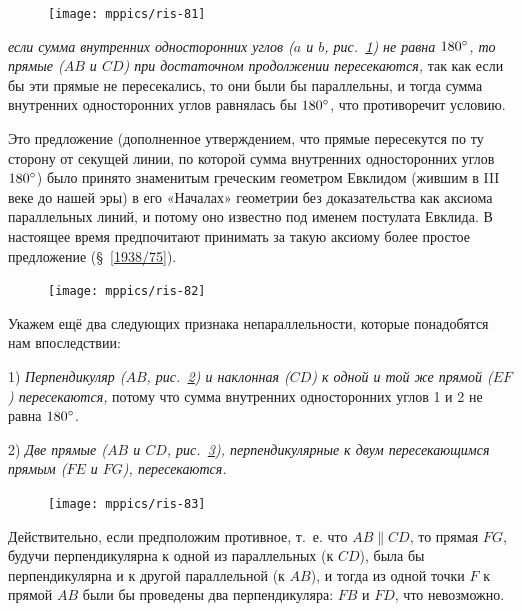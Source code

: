 \documentclass[oneside]{book}
\begin{document}
\begin{figure}[h!]
\centering
\texttt{[image: mppics/ris-81]}
\caption{}\label{1938/ris-81}
\end{figure}

\emph{если сумма внутренних односторонних углов \emph{($a$ и $b$, рис.~\ref{1938/ris-81})} не равна $180\degree$, то прямые \emph{($AB$ и $CD$)} при достаточном продолжении пересекаются,} так как если бы эти прямые не пересекались, то они были бы параллельны, и тогда сумма внутренних односторонних углов равнялась бы $180\degree$, что противоречит условию.

Это предложение (дополненное утверждением, что прямые пересекутся по ту сторону от секущей линии, по которой сумма внутренних односторонних углов  $180\degree$) было принято знаменитым греческим геометром Евклидом (жившим в III веке до нашей эры) в его «Началах» геометрии без доказательства как аксиома параллельных линий, и потому оно известно под именем постулата Евклида.
В настоящее время предпочитают принимать за такую аксиому более простое предложение (§~\ref{1938/75}).

{

\begin{figure}
\centering
\texttt{[image: mppics/ris-82]}
\caption{}\label{1938/ris-82}
\end{figure}

Укажем ещё два следующих признака непараллельности, которые понадобятся нам впоследствии:

1) \emph{Перпендикуляр \emph{($AB$, рис.~\ref{1938/ris-82})} и наклонная \emph{($CD$)} к одной и той же прямой \emph{($EF$)} пересекаются,} потому что сумма внутренних односторонних углов 1 и 2 не равна $180\degree$.

2) \emph{Две прямые \emph{($AB$ и $CD$, рис.~\ref{1938/ris-83}),} перпендикулярные к двум пересекающимся прямым \emph{($FE$ и $FG$),} пересекаются.}

\begin{figure}
\centering
\texttt{[image: mppics/ris-83]}
\caption{}\label{1938/ris-83}
\end{figure}

Действительно, если предположим противное, т.~е.
что $AB \parallel CD$, то прямая $FG$, будучи перпендикулярна к одной из параллельных (к $CD$), была бы перпендикулярна и к другой параллельной (к $AB$), и тогда из одной точки $F$ к прямой $AB$ были бы проведены два перпендикуляра:
$FB$ и $FD$, что невозможно.

}
\end{document}
